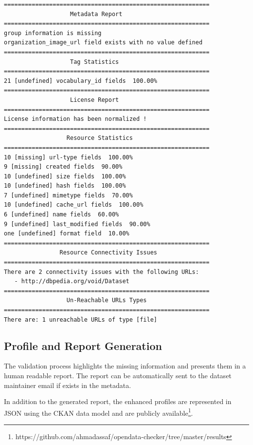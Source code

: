 \documentclass{sig-alternate}
\begin{document}
\begin{lstlisting}
===========================================================
                   Metadata Report
===========================================================
group information is missing
organization_image_url field exists with no value defined
===========================================================
                   Tag Statistics
===========================================================
21 [undefined] vocabulary_id fields  100.00%
===========================================================
                   License Report
===========================================================
License information has been normalized !
===========================================================
                  Resource Statistics
===========================================================
10 [missing] url-type fields  100.00%
9 [missing] created fields  90.00%
10 [undefined] size fields  100.00%
10 [undefined] hash fields  100.00%
7 [undefined] mimetype fields  70.00%
10 [undefined] cache_url fields  100.00%
6 [undefined] name fields  60.00%
9 [undefined] last_modified fields  90.00%
one [undefined] format field  10.00%
===========================================================
                Resource Connectivity Issues
===========================================================
There are 2 connectivity issues with the following URLs:
   - http://dbpedia.org/void/Dataset
===========================================================
                  Un-Reachable URLs Types
===========================================================
There are: 1 unreachable URLs of type [file]
\end{lstlisting}

\subsection{Profile and Report Generation}

The validation process highlights the missing information and presents them in a human readable report. The report can be automatically sent to the dataset maintainer email if exists in the metadata.

In addition to the generated report, the enhanced profiles are represented in JSON using the CKAN data model and are publicly available\footnote{https://github.com/ahmadassaf/opendata-checker/tree/master/results}.
\end{document}
